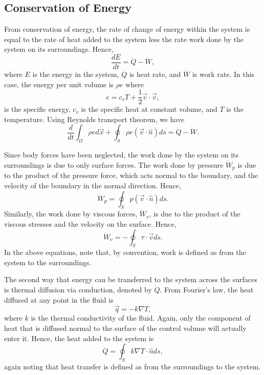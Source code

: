 \subsection{Conservation of Energy}
From conservation of energy, the rate of change of energy within the system is equal to the rate of heat added to the system less the rate work done by the system on its surroundings. Hence,
\begin{equation}
	\frac{dE}{dt} = \dot{Q}-\dot{W},
\end{equation}
where $E$ is the energy in the system, $\dot{Q}$ is heat rate, and $\dot {W}$ is work rate. In this case, the energy per unit volume is $\rho e$ where 
\begin{equation}
e = c_v T + \frac{1}{2} \vec{v} \cdot \vec{v},
\end{equation} 
is the specific energy, $c_v$ is the specific heat at constant volume, and $T$ is the temperature. Using Reynolds transport theorem, we have
\begin{equation}
\frac{d}{dt}\int_\Omega \rho e d\vec{x} + \oint_S \rho e (\vec{v} \cdot \hat{n}) ds = \dot{Q}-\dot{W}.
\end{equation}

Since body forces have been neglected, the work done by the system on its surroundings is due to only surface forces. The work done by pressure $\dot{W}_p$ is due to the product of the pressure force, which acts normal to the boundary, and the velocity of the boundary in the normal direction. Hence,
\begin{equation}
	\dot{W}_p = \oint_S p(\vec{v} \cdot \hat{n}) ds.
\end{equation}
Similarly, the work done by viscous forces, $\dot{W}_v$, is due to the product of the viscous stresses and the velocity on the surface. Hence, 
\begin{equation}
	\dot{W}_v = -\oint_S \tau \cdot \vec{v} ds.
\end{equation}
In the above equations, note that, by convention, work is defined as from the system to the surroundings.

The second way that energy can be transferred to the system across the surfaces is thermal diffusion via conduction, denoted by $\dot{Q}$. From Fourier's law, the heat diffused at any point in the fluid is
\begin{equation}
	\vec{q} = -k \nabla T,
\end{equation}
where $k$ is the thermal conductivity of the fluid. Again, only the component of heat that is diffused normal to the surface of the control volume will actually enter it. Hence, the heat added to the system is
\begin{equation}
	\dot{Q} = \oint_S k \nabla T \cdot \hat{n} ds,
\end{equation}
again noting that heat transfer is defined as from the surroundings to the system.

